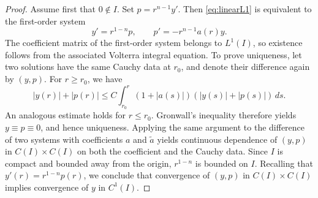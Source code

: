 \documentclass[11pt]{article}
\begin{document}
\begin{proof}
Assume first that $0\notin I$. Set $p=r^{n-1}y'$. Then \eqref{eq:linearL1} is equivalent to the first-order system
\[
 y'=r^{1-n}p,
 \qquad
 p'=-r^{n-1}a(r)y.
\]
The coefficient matrix of the first-order system belongs to $L^1(I)$, so existence follows from the associated Volterra integral equation. To prove uniqueness, let two solutions have the same Cauchy data at $r_0$, and denote their difference again by $(y,p)$. For $r\ge r_0$, we have
\[
 |y(r)|+|p(r)|\leq C\int_{r_0}^r(1+|a(s)|)(|y(s)|+|p(s)|)\,ds.
\]
An analogous estimate holds for $r\le r_0$. Gronwall's inequality therefore yields $y\equiv p\equiv0$, and hence uniqueness.
Applying the same argument to the difference of two systems with coefficients $a$ and $\tilde a$ yields continuous dependence of $(y,p)$ in $C(I)\times C(I)$ on both the coefficient and the Cauchy data. Since $I$ is compact and bounded away from the origin, $r^{1-n}$ is bounded on $I$. Recalling that
$y'(r)=r^{1-n}p(r)$,
we conclude that convergence of $(y,p)$ in $C(I)\times C(I)$ implies convergence of $y$ in $C^1(I)$.


\end{proof}
\end{document}
